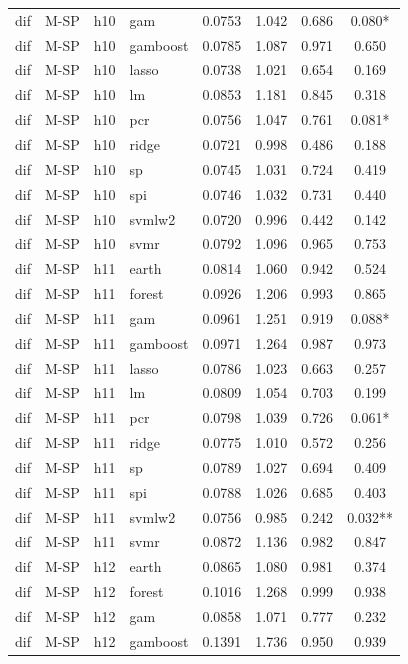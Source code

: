 \begin{ThreePartTable}
\begin{longtable}[t]{llclcccc}
dif & M-SP & h10 & gam & 0.0753 & 1.042 & 0.686 & 0.080*\\
dif & M-SP & h10 & gamboost & 0.0785 & 1.087 & 0.971 & 0.650\\
dif & M-SP & h10 & lasso & 0.0738 & 1.021 & 0.654 & 0.169\\
dif & M-SP & h10 & lm & 0.0853 & 1.181 & 0.845 & 0.318\\
dif & M-SP & h10 & pcr & 0.0756 & 1.047 & 0.761 & 0.081*\\
dif & M-SP & h10 & ridge & 0.0721 & 0.998 & 0.486 & 0.188\\
dif & M-SP & h10 & sp & 0.0745 & 1.031 & 0.724 & 0.419\\
dif & M-SP & h10 & spi & 0.0746 & 1.032 & 0.731 & 0.440\\
dif & M-SP & h10 & svmlw2 & 0.0720 & 0.996 & 0.442 & 0.142\\
dif & M-SP & h10 & svmr & 0.0792 & 1.096 & 0.965 & 0.753\\
\addlinespace
dif & M-SP & h11 & earth & 0.0814 & 1.060 & 0.942 & 0.524\\
dif & M-SP & h11 & forest & 0.0926 & 1.206 & 0.993 & 0.865\\
dif & M-SP & h11 & gam & 0.0961 & 1.251 & 0.919 & 0.088*\\
dif & M-SP & h11 & gamboost & 0.0971 & 1.264 & 0.987 & 0.973\\
dif & M-SP & h11 & lasso & 0.0786 & 1.023 & 0.663 & 0.257\\
dif & M-SP & h11 & lm & 0.0809 & 1.054 & 0.703 & 0.199\\
dif & M-SP & h11 & pcr & 0.0798 & 1.039 & 0.726 & 0.061*\\
dif & M-SP & h11 & ridge & 0.0775 & 1.010 & 0.572 & 0.256\\
dif & M-SP & h11 & sp & 0.0789 & 1.027 & 0.694 & 0.409\\
dif & M-SP & h11 & spi & 0.0788 & 1.026 & 0.685 & 0.403\\
dif & M-SP & h11 & svmlw2 & 0.0756 & 0.985 & 0.242 & 0.032**\\
dif & M-SP & h11 & svmr & 0.0872 & 1.136 & 0.982 & 0.847\\
\addlinespace
dif & M-SP & h12 & earth & 0.0865 & 1.080 & 0.981 & 0.374\\
dif & M-SP & h12 & forest & 0.1016 & 1.268 & 0.999 & 0.938\\
dif & M-SP & h12 & gam & 0.0858 & 1.071 & 0.777 & 0.232\\
dif & M-SP & h12 & gamboost & 0.1391 & 1.736 & 0.950 & 0.939\\

\end{longtable}
\end{ThreePartTable}
